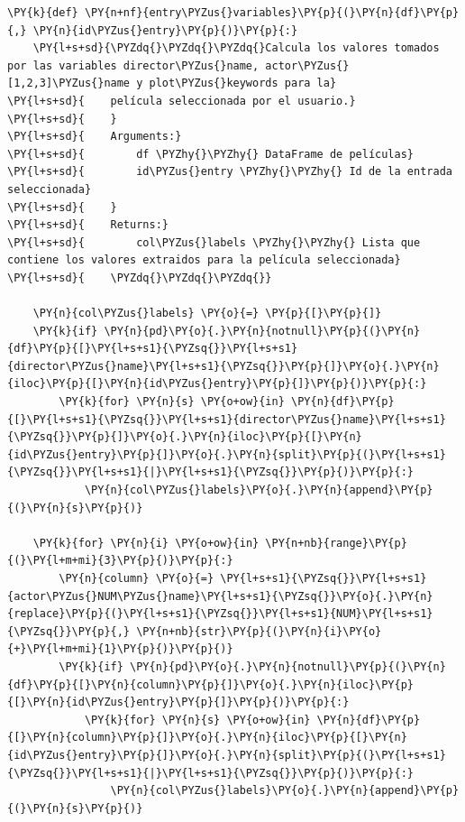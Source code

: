     \begin{tcolorbox}[breakable, size=fbox, boxrule=1pt, pad at break*=1mm,colback=cellbackground, colframe=cellborder]
\begin{Verbatim}[commandchars=\\\{\}]
\PY{k}{def} \PY{n+nf}{entry\PYZus{}variables}\PY{p}{(}\PY{n}{df}\PY{p}{,} \PY{n}{id\PYZus{}entry}\PY{p}{)}\PY{p}{:} 
    \PY{l+s+sd}{\PYZdq{}\PYZdq{}\PYZdq{}Calcula los valores tomados por las variables director\PYZus{}name, actor\PYZus{}[1,2,3]\PYZus{}name y plot\PYZus{}keywords para la}
\PY{l+s+sd}{    película seleccionada por el usuario.}
\PY{l+s+sd}{    }
\PY{l+s+sd}{    Arguments:}
\PY{l+s+sd}{        df \PYZhy{}\PYZhy{} DataFrame de películas}
\PY{l+s+sd}{        id\PYZus{}entry \PYZhy{}\PYZhy{} Id de la entrada seleccionada}
\PY{l+s+sd}{    }
\PY{l+s+sd}{    Returns:}
\PY{l+s+sd}{        col\PYZus{}labels \PYZhy{}\PYZhy{} Lista que contiene los valores extraidos para la película seleccionada}
\PY{l+s+sd}{    \PYZdq{}\PYZdq{}\PYZdq{}}
    
    \PY{n}{col\PYZus{}labels} \PY{o}{=} \PY{p}{[}\PY{p}{]}    
    \PY{k}{if} \PY{n}{pd}\PY{o}{.}\PY{n}{notnull}\PY{p}{(}\PY{n}{df}\PY{p}{[}\PY{l+s+s1}{\PYZsq{}}\PY{l+s+s1}{director\PYZus{}name}\PY{l+s+s1}{\PYZsq{}}\PY{p}{]}\PY{o}{.}\PY{n}{iloc}\PY{p}{[}\PY{n}{id\PYZus{}entry}\PY{p}{]}\PY{p}{)}\PY{p}{:}
        \PY{k}{for} \PY{n}{s} \PY{o+ow}{in} \PY{n}{df}\PY{p}{[}\PY{l+s+s1}{\PYZsq{}}\PY{l+s+s1}{director\PYZus{}name}\PY{l+s+s1}{\PYZsq{}}\PY{p}{]}\PY{o}{.}\PY{n}{iloc}\PY{p}{[}\PY{n}{id\PYZus{}entry}\PY{p}{]}\PY{o}{.}\PY{n}{split}\PY{p}{(}\PY{l+s+s1}{\PYZsq{}}\PY{l+s+s1}{|}\PY{l+s+s1}{\PYZsq{}}\PY{p}{)}\PY{p}{:}
            \PY{n}{col\PYZus{}labels}\PY{o}{.}\PY{n}{append}\PY{p}{(}\PY{n}{s}\PY{p}{)}
            
    \PY{k}{for} \PY{n}{i} \PY{o+ow}{in} \PY{n+nb}{range}\PY{p}{(}\PY{l+m+mi}{3}\PY{p}{)}\PY{p}{:}
        \PY{n}{column} \PY{o}{=} \PY{l+s+s1}{\PYZsq{}}\PY{l+s+s1}{actor\PYZus{}NUM\PYZus{}name}\PY{l+s+s1}{\PYZsq{}}\PY{o}{.}\PY{n}{replace}\PY{p}{(}\PY{l+s+s1}{\PYZsq{}}\PY{l+s+s1}{NUM}\PY{l+s+s1}{\PYZsq{}}\PY{p}{,} \PY{n+nb}{str}\PY{p}{(}\PY{n}{i}\PY{o}{+}\PY{l+m+mi}{1}\PY{p}{)}\PY{p}{)}
        \PY{k}{if} \PY{n}{pd}\PY{o}{.}\PY{n}{notnull}\PY{p}{(}\PY{n}{df}\PY{p}{[}\PY{n}{column}\PY{p}{]}\PY{o}{.}\PY{n}{iloc}\PY{p}{[}\PY{n}{id\PYZus{}entry}\PY{p}{]}\PY{p}{)}\PY{p}{:}
            \PY{k}{for} \PY{n}{s} \PY{o+ow}{in} \PY{n}{df}\PY{p}{[}\PY{n}{column}\PY{p}{]}\PY{o}{.}\PY{n}{iloc}\PY{p}{[}\PY{n}{id\PYZus{}entry}\PY{p}{]}\PY{o}{.}\PY{n}{split}\PY{p}{(}\PY{l+s+s1}{\PYZsq{}}\PY{l+s+s1}{|}\PY{l+s+s1}{\PYZsq{}}\PY{p}{)}\PY{p}{:}
                \PY{n}{col\PYZus{}labels}\PY{o}{.}\PY{n}{append}\PY{p}{(}\PY{n}{s}\PY{p}{)}
                

\end{Verbatim}
\end{tcolorbox}
